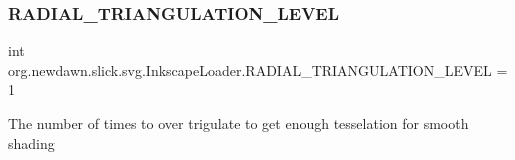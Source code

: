 \subsubsection{\texorpdfstring{R\+A\+D\+I\+A\+L\+\_\+\+T\+R\+I\+A\+N\+G\+U\+L\+A\+T\+I\+O\+N\+\_\+\+L\+E\+V\+EL}{RADIAL\_TRIANGULATION\_LEVEL}}
{\footnotesize\ttfamily int org.\+newdawn.\+slick.\+svg.\+Inkscape\+Loader.\+R\+A\+D\+I\+A\+L\+\_\+\+T\+R\+I\+A\+N\+G\+U\+L\+A\+T\+I\+O\+N\+\_\+\+L\+E\+V\+EL = 1\hspace{0.3cm}{\ttfamily [static]}}

The number of times to over trigulate to get enough tesselation for smooth shading 